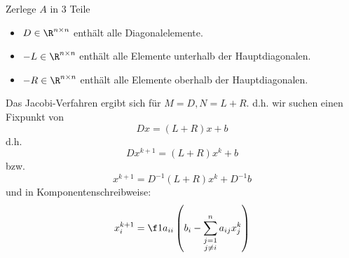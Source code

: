 \documentclass[a4paper]{scrartcl}
\numberwithin{equation}{section}
\begin{document}
Zerlege $A$ in 3 Teile
\begin{itemize}
	\item
		$D\in \R^{n\times n}$ enthält alle Diagonalelemente.
	\item
		$-L\in \R^{n\times n}$ enthält alle Elemente unterhalb der Hauptdiagonalen.
	\item
		$-R \in \R^{n\times n}$ enthält alle Elemente oberhalb der Hauptdiagonalen.
\end{itemize}
Das Jacobi-Verfahren ergibt sich für $M=D, N = L + R$.
d.h. wir suchen einen Fixpunkt von
\[
	Dx = (L+R)x + b
\]
d.h.
\[
	Dx^{k+1} = (L+R)x^k +b
\]
bzw.
\[
	x^{k+1} = D^{-1}(L+R)x^k + D^{-1}b
\]
und in Komponentenschreibweise:
\[
	x_i^{k+1} = \f 1{a_{ii}}\left(b_i - \sum_{\substack{j=1\\j\neq i}}^n a_{ij} x_j^k\right)
\]
\end{document}
